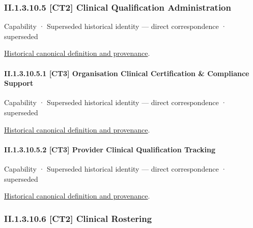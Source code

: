 \subsubsection*{II.1.3.10.5 [CT2] Clinical Qualification Administration}
\label{navigation:II.1.3.10.5}

\label{element:5fea7aaac4384245b1f08a3d8a076bd9}
{\small Capability · Superseded historical identity — direct correspondence · superseded}\par
\href{../../../../continuum/strategy/capability/5fea7aaac4384245b1f08a3d8a076bd9.md}{Historical canonical definition and provenance}.\par
\paragraph*{II.1.3.10.5.1 [CT3] Organisation Clinical Certification \& Compliance Support}
\label{navigation:II.1.3.10.5.1}

\label{element:cee76a930a4e4e7d9c49357ba290c8bf}
{\small Capability · Superseded historical identity — direct correspondence · superseded}\par
\href{../../../../continuum/strategy/capability/cee76a930a4e4e7d9c49357ba290c8bf.md}{Historical canonical definition and provenance}.\par
\paragraph*{II.1.3.10.5.2 [CT3] Provider Clinical Qualification Tracking}
\label{navigation:II.1.3.10.5.2}

\label{element:ab0415e2ea0a4da4ad3dc46997d48bc3}
{\small Capability · Superseded historical identity — direct correspondence · superseded}\par
\href{../../../../continuum/strategy/capability/ab0415e2ea0a4da4ad3dc46997d48bc3.md}{Historical canonical definition and provenance}.\par
\subsubsection*{II.1.3.10.6 [CT2] Clinical Rostering}
\label{navigation:II.1.3.10.6}

